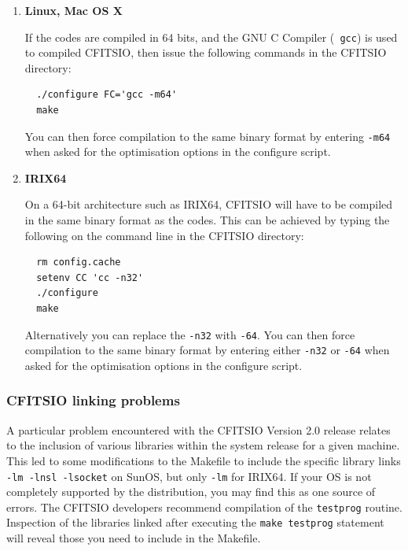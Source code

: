 \documentclass[12pt,twoside]{article}
\begin{document}
\begin{enumerate}
%
\item {\bf Linux, Mac OS X}

If the \healpix codes are compiled in 64 bits, and the GNU C Compiler ({\tt
gcc}) is used to compiled CFITSIO, then issue the following commands in the
CFITSIO directory:

\begin{verbatim}
  ./configure FC='gcc -m64'
  make
\end{verbatim}

You can
then force compilation to the same binary format by entering
\texttt{-m64} when asked for the optimisation options in the
\healpix configure script.

\item {\bf IRIX64}

On a 64-bit architecture such as IRIX64, CFITSIO will have to be
compiled in the same  binary format as the \healpix codes.
This can be achieved by typing the
following on the
command line in the CFITSIO directory:
 
\begin{verbatim}
  rm config.cache    
  setenv CC 'cc -n32'
  ./configure
  make
\end{verbatim}

Alternatively you can replace the \texttt{-n32} with \texttt{-64}. You can
then force compilation to the same binary format by entering either
\texttt{-n32} or \texttt{-64} when asked for the optimisation options in the
\healpix configure script.
%
\end{enumerate}

\subsubsection*{CFITSIO linking problems}

A particular problem encountered with the CFITSIO Version 2.0 release relates
to the inclusion of various libraries within the system release for a given
machine. This led to some modifications to the Makefile to include the specific
library links \texttt{-lm -lnsl -lsocket} on SunOS, but only \texttt{-lm} for IRIX64.
If your OS is not completely supported by the distribution, you may find this
as one source of errors. The CFITSIO developers recommend compilation of the
\texttt{testprog} routine. Inspection of the libraries linked after executing the
\texttt{make testprog} statement will reveal those you need to include in the
Makefile.
\end{document}
